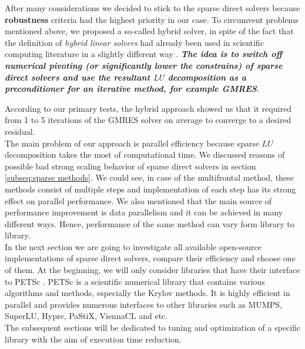 After many considerations we decided to stick to the sparse direct solvers because \textbf{robustness} criteria had the highest priority in our case. To circumvent problems mentioned above, we proposed a so-called hybrid solver, in spite of the fact that the definition of \textit{hybrid linear solvers} had already been used in scientific computing literature in a slightly different way \cite{shylu-hybrid-solver}. \textbf{\textit{The idea is to switch off numerical pivoting (or significantly lower the constrains) of sparse direct solvers and use the resultant $LU$ decomposition as a preconditioner for an iterative method, for example GMRES}}.\\



According to our primary tests, the hybrid approach showed us that it required from 1 to 5 iterations of the GMRES solver on average to converge to a desired residual.\\


The main problem of our approach is parallel efficiency because sparse $LU$ decomposition takes the most of computational time. We discussed reasons of possible bad strong scaling behavior of sparse direct solvers in section \ref{subseq:sparse methods}. We could see, in case of the multifrontal method, these methods consist of multiple steps and implementation of each step has its strong effect on parallel performance. We also mentioned that the main source of performance improvement is data parallelism and it can be achieved in many different ways. Hence, performance of the same method can vary form library to library.\\


In the next section we are going to investigate all available open-source implementations of sparse direct solvers, compare their efficiency and choose one of them. At the beginning, we will only consider libraries that have their interface to PETSc \cite{petsc-web-page}. PETSc is a scientific numerical library that contains various algorithms and methods, especially the Krylov methods. It is highly efficient in parallel and provides numerous interfaces to other libraries such as MUMPS, SuperLU, Hypre, PaStiX, ViennaCL and etc.\\ 


The subsequent sections will be dedicated to tuning and optimization of a specific library with the aim of execution time reduction. \\